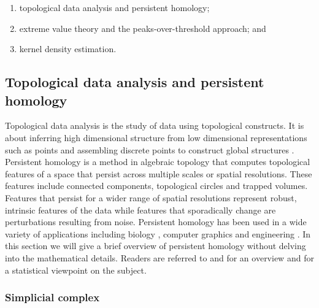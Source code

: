 \documentclass[12pt]{article}
\providecommand{\tightlist}{%
  \setlength{\itemsep}{0pt}\setlength{\parskip}{0pt}}
\theoremstyle{definition}
\theoremstyle{definition}
\theoremstyle{definition}
\theoremstyle{remark}
\begin{document}
\begin{enumerate}
\def\labelenumi{\arabic{enumi}.}
\tightlist
\item
  topological data analysis and persistent homology;
\item
  extreme value theory and the peaks-over-threshold approach; and
\item
  kernel density estimation.
\end{enumerate}

\hypertarget{subsec:tda}{%
\subsection{Topological data analysis and persistent homology}\label{subsec:tda}}

Topological data analysis is the study of data using topological constructs. It is about inferring high dimensional structure from low dimensional representations such as points and assembling discrete points to construct global structures \citep{ghrist2008barcodes}. Persistent homology is a method in algebraic topology that computes topological features of a space that persist across multiple scales or spatial resolutions. These features include connected components, topological circles and trapped volumes. Features that persist for a wider range of spatial resolutions represent robust, intrinsic features of the data while features that sporadically change are perturbations resulting from noise. Persistent homology has been used in a wide variety of applications including biology \citep{topaz2015topological}, computer graphics \citep{carlsson2008local} and engineering \citep{perea2015sliding}. In this section we will give a brief overview of persistent homology without delving into the mathematical details. Readers are referred to \citet{ghrist2008barcodes} and \citet{Carlsson2009} for an overview and \citet{wasserman2018topological} for a statistical viewpoint on the subject.

\hypertarget{simplicial-complex}{%
\subsubsection*{Simplicial complex}\label{simplicial-complex}}
\end{document}
